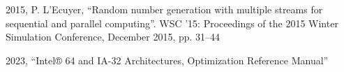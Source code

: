 \documentclass[preprint,1p,times]{elsarticle}
\begin{document}
\begin{thebibliography}{9}
				 2015, P. L'Ecuyer,  ``Random number generation with multiple streams for sequential and parallel computing''. WSC '15: Proceedings of the 2015 Winter Simulation Conference, December 2015, pp. 31–44
				
				 2023, ``Intel® 64 and IA-32 Architectures, Optimization Reference Manual''
				
				\begin{comment}
				@proceedings{10.5555/2888619,
				title = {WSC '15: Proceedings of the 2015 Winter Simulation Conference},
				year = {2015},
				isbn = {9781467397414},
				publisher = {IEEE Press},
				location = {Huntington Beach, California}
				}
				\end{comment}
				
			\end{thebibliography}
			
		
\end{document}

